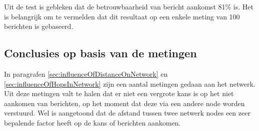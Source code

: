 Uit de test is gebleken dat de betrouwbaarheid van bericht aankomst 81\% is. Het is belangrijk om te vermelden dat dit resultaat op een enkele meting van 100 berichten is gebaseerd.

\subsection{Conclusies op basis van de metingen}
In paragrafen \ref{sec:influenceOfDistanceOnNetwork} en \ref{sec:influenceOfHopsInNetwork} zijn een aantal metingen gedaan aan het netwerk. Uit deze metingen valt te halen dat er niet een vergrote kans is op het niet aankomen van berichten, op het moment dat deze via een andere node worden verstuurd. Wel is aangetoond dat de afstand tussen twee netwerk nodes een zeer bepalende factor heeft op de kans of berichten aankomen.


